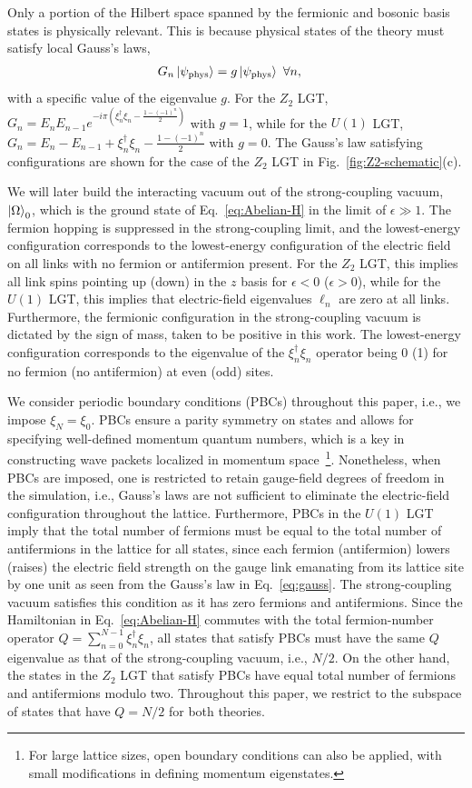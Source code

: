 \documentclass[a4paper,onecolumn,11pt,accepted=2024-10-11]{quantumarticle}
\begin{document}
Only a portion of the Hilbert space spanned by the fermionic and bosonic basis states is physically relevant. This is because physical states of the theory must satisfy local Gauss's laws,
%
\begin{align}
    &G_n\ket{\psi_{\text{phys}}} = g \ket{\psi_{\text{phys}}}~\forall n,\label{eq:gauss}
\end{align}
%
with a specific value of the eigenvalue $g$. For the $Z_2$ LGT, $G_n = E_nE_{n-1}e^{-i\pi(\xi_n^\dagger\xi_n-\frac{1-(-1)^n}{2})}$ with $g=1$, while for the $U(1)$ LGT, $G_n = E_n-E_{n-1}+\xi_n^\dagger\xi_n-\frac{1-(-1)^n}{2}$ with $g=0$. The Gauss's law satisfying configurations are shown for the case of the $Z_2$ LGT in Fig.~\ref{fig:Z2-schematic}(c).

We will later build the interacting vacuum out of the strong-coupling vacuum, $\ket{\Omega}_0$, which is the ground state of Eq.~\eqref{eq:Abelian-H} in the limit of $\epsilon \gg 1$.
The fermion hopping is suppressed in the strong-coupling limit, and the lowest-energy configuration corresponds to the lowest-energy configuration of the electric field on all links with no fermion or antifermion present. For the $Z_2$ LGT, this implies all link spins pointing up (down) in the $z$ basis for $\epsilon < 0$ ($\epsilon > 0$), while for the $U(1)$ LGT, this implies that electric-field eigenvalues $\ell_n$ are zero at all links. Furthermore, the fermionic configuration in the strong-coupling vacuum is dictated by the sign of mass, taken to be positive in this work. The lowest-energy configuration corresponds to the eigenvalue of the $\xi^\dagger_n \xi_n$ operator being 0 (1) for no fermion (no antifermion) at even (odd) sites. 

We consider periodic boundary conditions (PBCs) throughout this paper, i.e., we impose $\xi_N=\xi_0$. PBCs ensure a parity symmetry on states and allows for specifying well-defined momentum quantum numbers, which is a key in constructing wave packets localized in momentum space~\footnote{For large lattice sizes, open boundary conditions can also be applied, with small modifications in defining momentum eigenstates.}. Nonetheless, when PBCs are imposed, one is restricted to retain gauge-field degrees of freedom in the simulation, i.e., Gauss's laws are not sufficient to eliminate the electric-field configuration throughout the lattice. Furthermore, PBCs in the $U(1)$ LGT imply that the total number of fermions must be equal to the total number of antifermions in the lattice for all states, since each fermion (antifermion) lowers (raises) the electric field strength on the gauge link emanating from its lattice site by one unit as seen from the Gauss's law in Eq.~\eqref{eq:gauss}. The strong-coupling vacuum satisfies this condition as it has zero fermions and antifermions.
Since the Hamiltonian in Eq.~\eqref{eq:Abelian-H} commutes with the total fermion-number operator $Q=\sum_{n=0}^{N-1} \xi^\dagger_n\xi_n$, all states that satisfy PBCs must have the same $Q$ eigenvalue as that of the strong-coupling vacuum, i.e., $N/2$. On the other hand, the states in the $Z_2$ LGT that satisfy PBCs have equal total number of fermions and antifermions modulo two. Throughout this paper, we restrict to the subspace of states that have $Q=N/2$ for both theories.
\end{document}
